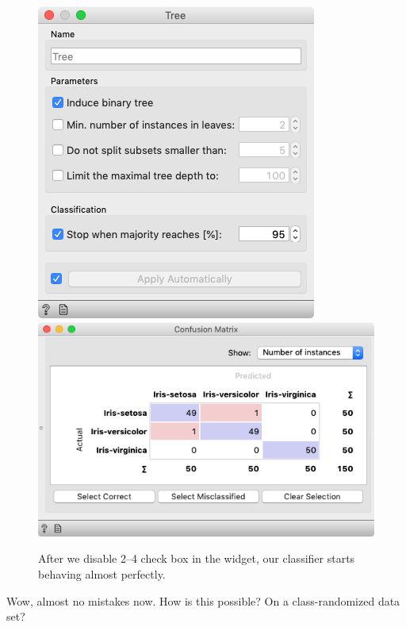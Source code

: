 \begin{figure}[h]
    \includegraphics[scale=0.35]{graphics/ch-how_to_cheat/better_tree.png}
    \includegraphics[scale=0.35]{graphics/ch-how_to_cheat/confusion_randomized_better.png}
    \caption{After we disable 2--4 check box in the  widget, our classifier starts behaving almost perfectly.}
\end{figure}


Wow, almost no mistakes now. How is this possible? On a class-randomized data set?

